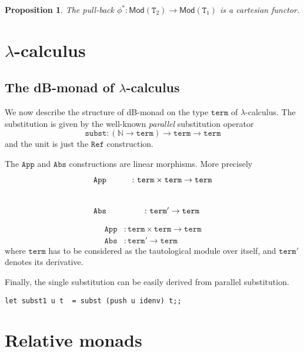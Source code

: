 \documentclass[a4paper,twoside,12pt,draft]{article}
\newtheorem{proposition}{Proposition}
\theoremstyle{definition}
\theoremstyle{remark}
\newcommand{\NN}{\mathbb{N}}
\newcommand{\TT}{\mathtt{T}}
\begin{document}
\begin{proposition}
  \label{prop:pull-back-functor}
  The pull-back
  $\phi^* \colon \mathsf{Mod}(\TT_2) \to \mathsf{Mod}(\TT_1)$ is a
  cartesian functor.
\end{proposition}

\section{$\lambda$-calculus}
\label{sec:lambda-calculus}

\subsection{The dB-monad of $\lambda$-calculus}
\label{sec:db-monad-lambda}

We now describe the structure of dB-monad on the type $\mathtt{term}$
of $\lambda$-calculus.  The substitution is given by the
well-known \emph{parallel} substitution operator
\begin{equation*}
  \mathtt{subst}\colon (\NN \to \mathtt{term}) \to
  \mathtt{term} \to \mathtt{term}
\end{equation*}
and the unit is just the $\mathtt{Ref}$ construction.

The $\mathtt{App}$ and $\mathtt{Abs}$ constructions are linear
morphisms.  More precisely
\begin{equation*}
  \xymatrix{
    \mathtt{App} &\colon \mathtt{term} \times \mathtt{term} \to
                 \mathtt{term} \\
  \mathtt{Abs} &\colon \mathtt{term}' \to \mathtt{term}}
\end{equation*}

\begin{align*}
  \mathtt{App} &\colon \mathtt{term} \times \mathtt{term} \to
                 \mathtt{term} \\
\mathtt{Abs} &\colon \mathtt{term}' \to \mathtt{term}
\end{align*}
where $\mathtt{term}$ has to be considered as the tautological module
over itself, and $\mathtt{term}'$ denotes its derivative.

Finally, the single substitution can be easily derived from parallel substitution.
\begin{verbatim}
let subst1 u t  = subst (push u idenv) t;;
\end{verbatim}

\section{Relative monads}
\label{sec:relative-monads}
\end{document}
